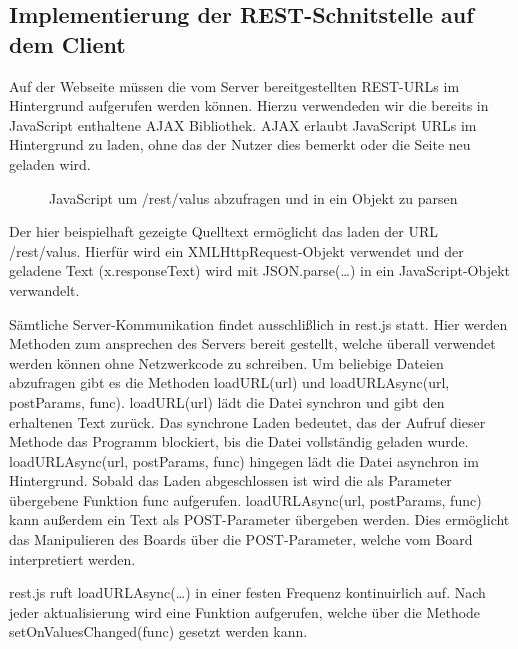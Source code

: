 

\subsection{Implementierung der REST-Schnitstelle auf dem Client}
Auf der Webseite müssen die vom Server bereitgestellten \ac{REST}-URLs im
Hintergrund aufgerufen werden können. Hierzu verwendeden wir die bereits in JavaScript
enthaltene \ac{AJAX} Bibliothek. \ac{AJAX} erlaubt JavaScript URLs im
Hintergrund zu laden, ohne das der Nutzer dies bemerkt oder die Seite neu geladen wird. 

\begin{figure}[H]

\caption{JavaScript um \textrm{/rest/valus} abzufragen und in ein Objekt zu
parsen}
\label{Ein typischer AJAX-Request}
\end{figure}

Der hier beispielhaft gezeigte Quelltext ermöglicht das laden der \ac{URL}
\textrm{/rest/valus}.
Hierfür wird ein XMLHttpRequest-Objekt verwendet und der geladene Text
(\textrm{x.responseText}) wird mit \textrm{JSON.parse(\ldots)} in ein
JavaScript-Objekt verwandelt.

Sämtliche Server-Kommunikation findet ausschlißlich in \textrm{rest.js} statt.
Hier werden Methoden zum ansprechen des Servers bereit gestellt, welche überall
verwendet werden können ohne Netzwerkcode zu schreiben. Um beliebige Dateien
abzufragen gibt es die Methoden \textrm{loadURL(url)} und
\textrm{loadURLAsync(url, postParams, func)}. \textrm{loadURL(url)} lädt die
Datei synchron und gibt den erhaltenen Text zurück. Das synchrone Laden
bedeutet, das der Aufruf dieser Methode das Programm blockiert, bis die Datei
vollständig geladen wurde. \textrm{loadURLAsync(url, postParams, func)} hingegen
lädt die Datei asynchron im Hintergrund. Sobald das Laden abgeschlossen ist wird
die als Parameter übergebene Funktion \textrm{func} aufgerufen.
\textrm{loadURLAsync(url, postParams, func)} kann außerdem ein Text als
POST-Parameter übergeben werden. Dies ermöglicht das Manipulieren des Boards
über die POST-Parameter, welche vom Board interpretiert werden.

\textrm{rest.js} ruft \textrm{loadURLAsync(\ldots)} in einer festen Frequenz
kontinuirlich auf. Nach jeder aktualisierung wird eine Funktion aufgerufen,
welche über die Methode \textrm{setOnValuesChanged(func)} gesetzt werden kann.

